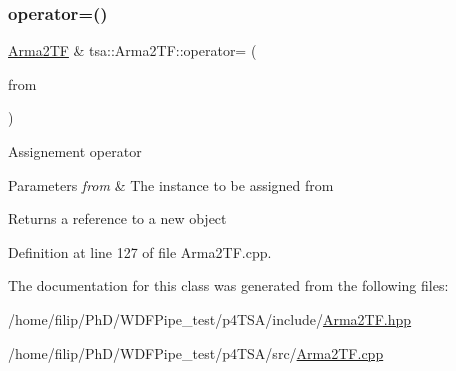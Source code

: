 \subsubsection{\texorpdfstring{operator=()}{operator=()}}
{\footnotesize\ttfamily \hyperlink{classtsa_1_1_arma2_t_f}{Arma2\+TF} \& tsa\+::\+Arma2\+T\+F\+::operator= (\begin{DoxyParamCaption}\item[{const \hyperlink{classtsa_1_1_arma2_t_f}{Arma2\+TF} \&}]{from }\end{DoxyParamCaption})}

Assignement operator


\begin{DoxyParams}{Parameters}
{\em from} & The instance to be assigned from\\
\hline
\end{DoxyParams}
\begin{DoxyReturn}{Returns}
a reference to a new object 
\end{DoxyReturn}


Definition at line 127 of file Arma2\+T\+F.\+cpp.



The documentation for this class was generated from the following files\+:\begin{DoxyCompactItemize}
\item 
/home/filip/\+Ph\+D/\+W\+D\+F\+Pipe\+\_\+test/p4\+T\+S\+A/include/\hyperlink{_arma2_t_f_8hpp}{Arma2\+T\+F.\+hpp}\item 
/home/filip/\+Ph\+D/\+W\+D\+F\+Pipe\+\_\+test/p4\+T\+S\+A/src/\hyperlink{_arma2_t_f_8cpp}{Arma2\+T\+F.\+cpp}\end{DoxyCompactItemize}
